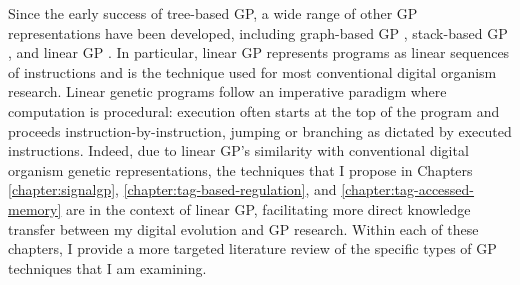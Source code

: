 Since the early success of tree-based GP, a wide range of other GP representations have been developed, including graph-based GP \citep{miller_empirical_1999,kelly_multi-task_2017}, stack-based GP \citep{perkis_stack-based_1994,spector_autoconstructive_2001}, and linear GP \citep{brameier_linear_2007}. 
In particular, linear GP represents programs as linear sequences of instructions and is the technique used for most conventional digital organism research.
Linear genetic programs follow an imperative paradigm where computation is procedural: execution often starts at the top of the program and proceeds instruction-by-instruction, jumping or branching as dictated by executed instructions.
Indeed, due to linear GP's similarity with conventional digital organism genetic representations, the techniques that I propose in Chapters \ref{chapter:signalgp}, \ref{chapter:tag-based-regulation}, and \ref{chapter:tag-accessed-memory} are in the context of linear GP, facilitating more direct knowledge transfer between my digital evolution and GP research.
Within each of these chapters, I provide a more targeted literature review of the specific types of GP techniques that I am examining.






